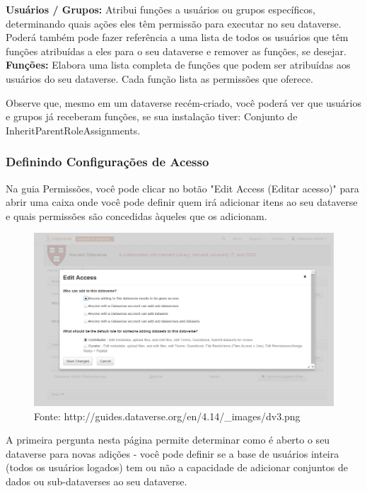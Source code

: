 \documentclass[12pt,hidelinks]{article}
\begin{document}
\textbf{Usuários / Grupos:} Atribui funções a usuários ou grupos específicos, determinando quais ações eles têm permissão para executar no seu dataverse. Poderá também pode fazer referência a uma lista de todos os usuários que têm funções atribuídas a eles para o seu dataverse e remover as funções, se desejar.\\

\textbf{Funções:} Elabora uma lista completa de funções que podem ser atribuídas aos usuários do seu dataverse. Cada função lista as permissões que oferece.

Observe que, mesmo em um dataverse recém-criado, você poderá ver que usuários e grupos já receberam funções, se sua instalação tiver: Conjunto de InheritParentRoleAssignments.

        \subsubsection{Definindo Configurações de Acesso}
        
\qquad Na guia Permissões, você pode clicar no botão "Edit Access (Editar acesso)" para abrir uma caixa onde você pode definir quem irá adicionar itens ao seu dataverse e quais permissões são concedidas àqueles que os adicionam.
        
  \begin{figure}[H]
                \centering
                \includegraphics[scale=0.4]{prt3.png}
                \caption{Fonte: http://guides.dataverse.org/en/4.14/\_images/dv3.png}
            \label{Acesso}
        \end{figure}
  
 A primeira pergunta nesta página permite determinar como é aberto o seu dataverse para novas adições - você pode definir se a base de usuários inteira (todos os usuários logados) tem ou não a capacidade de adicionar conjuntos de dados ou sub-dataverses ao seu dataverse.
\end{document}
